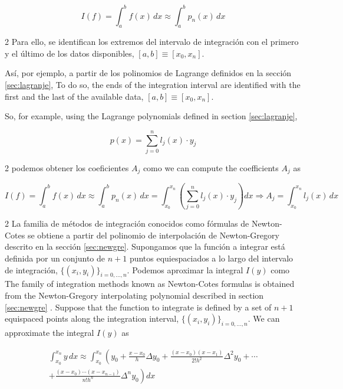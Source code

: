  \begin{equation*}
I(f)=\int_a^bf(x)\,dx \approx \int_a^bp_n(x)\,dx
\end{equation*}
\begin{paracol}{2}
Para ello, se identifican los extremos del intervalo de integración con el primero y el último de los datos disponibles, $[a,b]\equiv [x_0,x_n]$.

Así, por ejemplo, a partir de los polinomios de Lagrange definidos en la sección \ref{sec:lagranje},
\switchcolumn
To do so, the ends of the integration interval are identified with the first and the last of the available data, $[a,b]\equiv [x_0,x_n]$.

So, for example, using the Lagrange polynomials defined in section \ref{sec:lagranje},
\end{paracol}
\begin{equation*}
p(x)=\sum_{j=0}^n l_j(x)\cdot y_j
\end{equation*}
\begin{paracol}{2}
podemos obtener los coeficientes $A_j$ como
\switchcolumn
we can compute the coefficients $A_j$ as
\end{paracol}
\begin{equation*}
I(f)=\int_a^bf(x)\,dx \approx \int_a^bp_n(x)\,dx=\int_{x_0}^{x_n}\left( \sum_{j=0}^n l_j(x)\cdot y_j \right) dx \Rightarrow A_j=\int_{x_0}^{x_n}l_j(x)\,dx
\end{equation*}
\begin{paracol}{2}
La familia de métodos de integración conocidos como fórmulas de Newton-Cotes se obtiene a partir del polinomio de interpolación de Newton-Gregory descrito en la sección \ref{sec:newgre}. Supongamos que la función a integrar está definida por un conjunto de $n+1$ puntos equiespaciados a lo largo del intervalo de integración, $\{(x_i,y_i)\}_{i=0,\dots, n}$. Podemos aproximar la integral $I(y)$ como
\switchcolumn
The family of integration me\-thods known as Newton-Cotes formulas is obtained from the Newton-Gregory interpolating polynomial described in section \ref{sec:newgre} . Suppose that the function to integrate is defined by a set of $n+1$ equispaced points along the integration interval, $\{(x_i,y_i)\}_{i=0,\dots, n}$. We can approximate the integral $I(y)$ as
\end{paracol}
\begin{multline*}
\int_{x_0}^{x_n}y\,dx \approx \int_{x_0}^{x_n}\left(y_0+\frac{x-x_0}{h}\Delta y_0+\frac{(x-x_0)(x-x_1)}{2!h^2}\Delta ^2 y_0+\cdots \right.\\
\left. +\frac{(x-x_0)\cdots(x-x_{n-1})}{n!h^n}\Delta^n y_0 \right)dx
\end{multline*}
